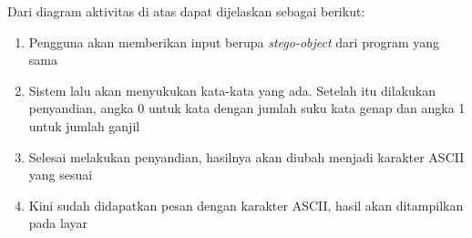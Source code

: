 Dari diagram aktivitas di atas dapat dijelaskan sebagai berikut:

\begin{enumerate}
	\item Pengguna akan memberikan input berupa \textit{stego-object} dari program yang sama
	\item Sistem lalu akan menyukukan kata-kata yang ada. Setelah itu dilakukan penyandian, angka 0 untuk kata dengan jumlah suku kata genap dan angka 1 untuk jumlah ganjil
	\item Selesai melakukan penyandian, hasilnya akan diubah menjadi karakter ASCII yang sesuai
	\item Kini sudah didapatkan pesan dengan karakter ASCII, hasil akan ditampilkan pada layar
\end{enumerate}